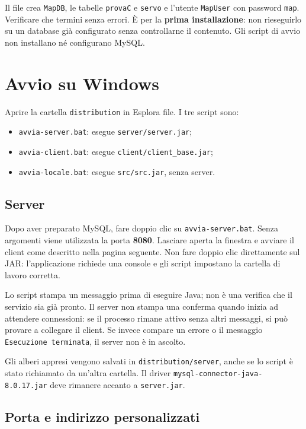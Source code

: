 \documentclass[11pt,a4paper]{article}
\begin{document}
Il file crea \texttt{MapDB}, le tabelle \texttt{provaC} e \texttt{servo} e
l'utente \texttt{MapUser} con password \texttt{map}. Verificare che termini
senza errori. È per la \textbf{prima installazione}: non rieseguirlo su un
database già configurato senza controllarne il contenuto.
Gli script di avvio non installano né configurano MySQL.

\clearpage
\section*{Avvio su Windows}

Aprire la cartella \texttt{distribution} in Esplora file. I tre script sono:
\begin{itemize}
  \item \texttt{avvia-server.bat}: esegue \texttt{server/server.jar};
  \item \texttt{avvia-client.bat}: esegue \texttt{client/client\_base.jar};
  \item \texttt{avvia-locale.bat}: esegue \texttt{src/src.jar}, senza server.
\end{itemize}

\subsection*{Server}

Dopo aver preparato MySQL, fare doppio clic su \texttt{avvia-server.bat}.
Senza argomenti viene utilizzata la porta \textbf{8080}.
Lasciare aperta la finestra e avviare il client come descritto nella pagina
seguente. Non fare doppio clic direttamente sul JAR: l'applicazione richiede
una console e gli script impostano la cartella di lavoro corretta.

Lo script stampa un messaggio prima di eseguire Java; non è una verifica
che il servizio sia già pronto. Il server non stampa una conferma quando
inizia ad attendere connessioni: se il processo rimane attivo senza altri
messaggi, si può provare a collegare il client. Se invece compare un errore
o il messaggio \texttt{Esecuzione terminata}, il server non è in ascolto.

Gli alberi appresi vengono salvati in \texttt{distribution/server}, anche
se lo script è stato richiamato da un'altra cartella. Il driver
\texttt{mysql-connector-java-8.0.17.jar} deve rimanere accanto a
\texttt{server.jar}.

\subsection*{Porta e indirizzo personalizzati}
\end{document}
